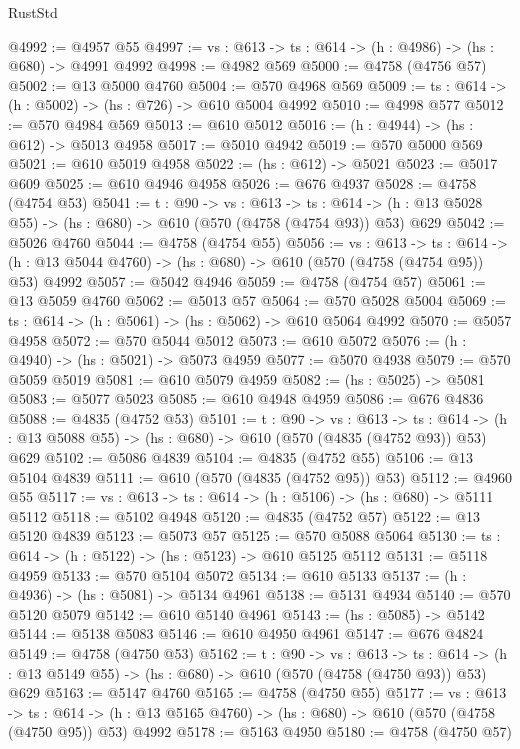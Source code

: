 \begin{lexlean}{RustStd}
\begin{coremodule}
@4992 := @4957 @55
@4997 := {vs : @613} -> {ts : @614} -> (h : @4986) -> (hs : @680) -> @4991 @4992
@4998 := @4982 @569
@5000 := @4758 (@4756 @57)
@5002 := @13 @5000 @4760
@5004 := @570 @4968 @569
@5009 := {ts : @614} -> (h : @5002) -> (hs : @726) -> @610 @5004 @4992
@5010 := @4998 @577
@5012 := @570 @4984 @569
@5013 := @610 @5012
@5016 := (h : @4944) -> (hs : @612) -> @5013 @4958
@5017 := @5010 @4942
@5019 := @570 @5000 @569
@5021 := @610 @5019 @4958
@5022 := (hs : @612) -> @5021
@5023 := @5017 @609
@5025 := @610 @4946 @4958
@5026 := @676 @4937
@5028 := @4758 (@4754 @53)
@5041 := {t : @90} ->
  {vs : @613} ->
  {ts : @614} -> (h : @13 @5028 @55) -> (hs : @680) -> @610 (@570 (@4758 (@4754 @93)) @53) @629
@5042 := @5026 @4760
@5044 := @4758 (@4754 @55)
@5056 := {vs : @613} ->
  {ts : @614} -> (h : @13 @5044 @4760) -> (hs : @680) -> @610 (@570 (@4758 (@4754 @95)) @53) @4992
@5057 := @5042 @4946
@5059 := @4758 (@4754 @57)
@5061 := @13 @5059 @4760
@5062 := @5013 @57
@5064 := @570 @5028 @5004
@5069 := {ts : @614} -> (h : @5061) -> (hs : @5062) -> @610 @5064 @4992
@5070 := @5057 @4958
@5072 := @570 @5044 @5012
@5073 := @610 @5072
@5076 := (h : @4940) -> (hs : @5021) -> @5073 @4959
@5077 := @5070 @4938
@5079 := @570 @5059 @5019
@5081 := @610 @5079 @4959
@5082 := (hs : @5025) -> @5081
@5083 := @5077 @5023
@5085 := @610 @4948 @4959
@5086 := @676 @4836
@5088 := @4835 (@4752 @53)
@5101 := {t : @90} ->
  {vs : @613} ->
  {ts : @614} -> (h : @13 @5088 @55) -> (hs : @680) -> @610 (@570 (@4835 (@4752 @93)) @53) @629
@5102 := @5086 @4839
@5104 := @4835 (@4752 @55)
@5106 := @13 @5104 @4839
@5111 := @610 (@570 (@4835 (@4752 @95)) @53)
@5112 := @4960 @55
@5117 := {vs : @613} -> {ts : @614} -> (h : @5106) -> (hs : @680) -> @5111 @5112
@5118 := @5102 @4948
@5120 := @4835 (@4752 @57)
@5122 := @13 @5120 @4839
@5123 := @5073 @57
@5125 := @570 @5088 @5064
@5130 := {ts : @614} -> (h : @5122) -> (hs : @5123) -> @610 @5125 @5112
@5131 := @5118 @4959
@5133 := @570 @5104 @5072
@5134 := @610 @5133
@5137 := (h : @4936) -> (hs : @5081) -> @5134 @4961
@5138 := @5131 @4934
@5140 := @570 @5120 @5079
@5142 := @610 @5140 @4961
@5143 := (hs : @5085) -> @5142
@5144 := @5138 @5083
@5146 := @610 @4950 @4961
@5147 := @676 @4824
@5149 := @4758 (@4750 @53)
@5162 := {t : @90} ->
  {vs : @613} ->
  {ts : @614} -> (h : @13 @5149 @55) -> (hs : @680) -> @610 (@570 (@4758 (@4750 @93)) @53) @629
@5163 := @5147 @4760
@5165 := @4758 (@4750 @55)
@5177 := {vs : @613} ->
  {ts : @614} -> (h : @13 @5165 @4760) -> (hs : @680) -> @610 (@570 (@4758 (@4750 @95)) @53) @4992
@5178 := @5163 @4950
@5180 := @4758 (@4750 @57)

\end{coremodule}
\end{lexlean}
